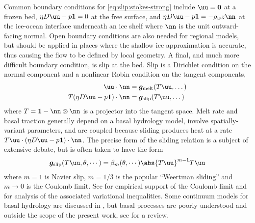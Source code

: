 Common boundary conditions for \eqref{eq:slip:stokes-strong} include $\uu = \bm 0$ at a frozen bed, $\eta D\uu - p\bm 1 = 0$ at the free surface, and $\eta D\uu - p\bm 1 = -\rho_w z \nn$ at the ice-ocean interface underneath an ice shelf where $\nn$ is the unit outward-facing normal.
Open boundary conditions are also needed for regional models, but should be applied in places where the shallow ice approximation is accurate, thus causing the flow to be defined by local geometry.
A final, and much more difficult boundary condition, is slip at the bed.
Slip is a Dirichlet condition on the normal component and a nonlinear Robin condition on the tangent components,
\begin{align}\label{eq:slip:bcstrong}
  \uu\cdot\nn &= \bm g_{\text{melt}}(T\uu,\dotsc) \\
  T (\eta D\uu - p\bm 1)\cdot\nn &= \bm g_{\text{slip}}(T \uu,\dotsc)
\end{align}
where $T = \bm 1 - \nn\otimes\nn$ is a projector into the tangent space.
Melt rate and basal traction generally depend on a basal hydrology model, involve spatially-variant parameters, and are coupled because sliding produces heat at a rate $T\uu\cdot(\eta D\uu - p\bm 1)\cdot\nn$.
The precise form of the sliding relation is a subject of extensive debate, but is often taken to have the form
\begin{gather*}
  \bm g_{\text{slip}}(T\uu,\theta,\cdots) = \beta_m(\theta,\cdots) \abs{T\uu}^{m-1} T\uu
\end{gather*}
where $m=1$ is Navier slip, $m=1/3$ is the popular ``Weertman sliding'' \citep{weertman1957sliding} and $m\to 0$ is the Coulomb limit.
See \citet{iverson1998ring} for empirical support of the Coulomb limit and \citet{schoof2006variational,schoof2006plastic,schoof2007isg} for analysis of the associated variational inequalities.
Some continuum models for basal hydrology are discussed in \citet{flowers2002multicomponent1,flowers2002multicomponent1,johnson2002nhg}, but basal processes are poorly understood and outside the scope of the present work, see \citet{clarke2004subglacial} for a review.

